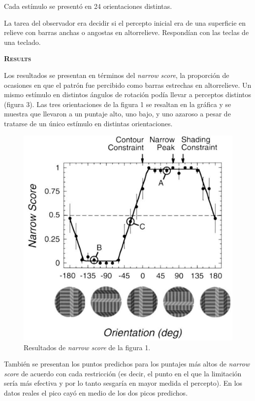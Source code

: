 \documentclass[a4paper,12pt]{article}
\begin{document}
Cada estímulo se presentó en 24 orientaciones distintas.

La tarea del observador era decidir si el percepto inicial era de una superficie en relieve con barras anchas o angostas en altorrelieve. Respondían con las teclas de una teclado.

{\scshape\bfseries Results}

Los resultados se presentan en términos del {\itshape narrow score}, la proporción de ocasiones en que el patrón fue percibido como barras estrechas en altorrelieve. Un mismo estímulo en distintos ángulos de rotación podía llevar a perceptos distintos (figura 3). Las tres orientaciones de la figura 1 se resaltan en la gráfica y se muestra que llevaron a un puntaje alto, uno bajo, y uno azaroso a pesar de tratarse de un único estímulo en distintas orientaciones.

\begin{figure}[ht]
	\begin{center}
		\includegraphics[scale=0.5]{Mamassian2001a(3).png}
		\caption{Resultados de {\itshape narrow score} de la figura 1.}
	\end{center}
\end{figure}

También se presentan los puntos predichos para los puntajes más altos de {\itshape narrow score} de acuerdo con cada restricción (es decir, el punto en el que la limitación sería más efectiva y por lo tanto sesgaría en mayor medida el percepto). En los datos reales el pico cayó en medio de los dos picos predichos.
\end{document}
